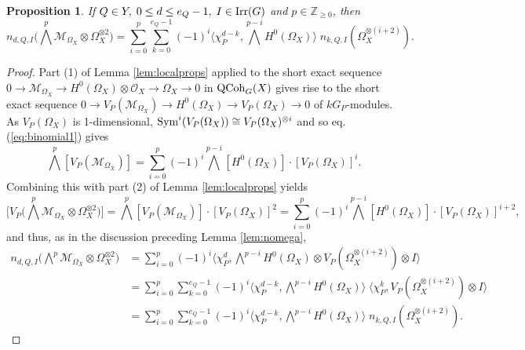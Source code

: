 \documentclass[10pt]{amsart}
\newtheorem{proposition}[theorem]{Proposition}
\theoremstyle{definition}
\begin{document}
\begin{proposition}\label{prop:binomial3}
If $Q\in Y,\;0\leq d\leq e_Q-1,\;I\in{\rm Irr}(G)$ and $p\in\mathbb{Z}_{\geq 0}$, then
\[
n_{d,Q,I}\big(\bigwedge^p\mathcal{M}_{\Omega_X}\otimes \Omega_X^{\otimes 2}\big)
=\sum_{i=0}^p
\sum_{k=0}^{e_Q-1}
(-1)^i
\langle
\chi_P^{d-k},
\bigwedge^{p-i}H^0(\Omega_X)
\rangle
\;
n_{k,Q,I}(\Omega_X^{\otimes (i+2)}).
\]
\end{proposition}
\begin{proof}
Part (1) of Lemma \ref{lem:localprops} applied to the short exact sequence $0\rightarrow \mathcal{M}_{\Omega_X}\rightarrow H^0(\Omega_X)\otimes\mathcal{O}_X\rightarrow {\Omega}_X\rightarrow 0$ in ${\rm QCoh}_G(X)$ gives rise to the short exact sequence $0\rightarrow V_P(\mathcal{M}_{\Omega_X})\rightarrow H^0(\Omega_X)\rightarrow V_{P}(\Omega_X)\rightarrow 0$ of $kG_P$-modules. As $V_{P}(\Omega_X)$ is 1-dimensional,  ${\rm Sym}^i(V_{P}(\Omega_X))\cong V_{P}(\Omega_X)^{\otimes i}$ and so eq. (\ref{eq:binomial1}) gives
\[
\bigwedge^p [V_P(\mathcal{M}_{\Omega_X})]
=
\sum_{i=0}^p (-1)^i\bigwedge^{p-i}[H^0(\Omega_X)]\cdot[ V_P(\Omega_X)]^{i}.
\]
Combining this with part (2) of Lemma \ref{lem:localprops} yields
\[
\big[V_P\big(\bigwedge^p\mathcal{M}_{\Omega_X}\otimes \Omega_X^{\otimes 2}\big)\big]
=
\bigwedge^p [V_P(\mathcal{M}_{\Omega_X})]\cdot [V_P(\Omega_X)]^{ 2}
=
\sum_{i=0}^p (-1)^i \bigwedge^{p-i}[H^0(\Omega_X)]\cdot [ V_P(\Omega_X)]^{ i+2},
\]
and thus, as in the discussion preceding Lemma \ref{lem:nomega},
\begin{align*}
n_{d,Q,I}\big(\bigwedge^p\mathcal{M}_{\Omega_X}\otimes \Omega_X^{\otimes 2}\big)
&=
\sum_{i=0}^p(-1)^i
\langle\chi_P^d,\bigwedge^{p-i}H^0(\Omega_X)\otimes V_P(\Omega_X^{\otimes (i+2)})\otimes I
\rangle
\\
&=\sum_{i=0}^p
\sum_{k=0}^{e_Q-1}
(-1)^i
\langle
 \chi_P^{d-k},
\bigwedge^{p-i}H^0(\Omega_X)
\rangle
\;
\langle \chi_P^k,
 V_P(\Omega_X^{\otimes (i+2)})\otimes I
\rangle\\
&=\sum_{i=0}^p
\sum_{k=0}^{e_Q-1}
(-1)^i
\langle
\chi_P^{d-k},
\bigwedge^{p-i}H^0(\Omega_X)
\rangle
\;
n_{k,Q,I}(\Omega_X^{\otimes (i+2)}).
\end{align*}

\end{proof}
\end{document}
